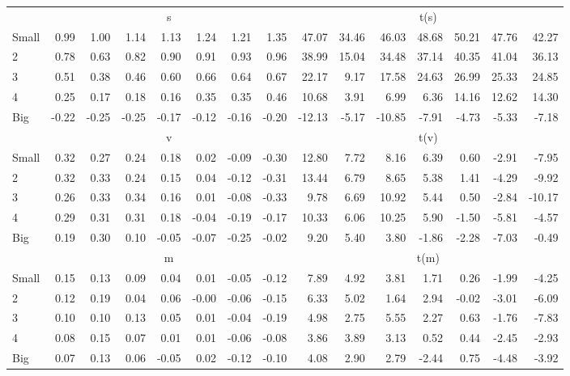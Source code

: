 \begin{table}[!ht]
\begin{tabular}{lrrrrrrrrrrrrrr}
  
     & \multicolumn{7}{c}{s} & \multicolumn{7}{c}{t(s)}   \\
     \cmidrule(r){2-8} \cmidrule(r){9-15} 
    Small  & 0.99  & 1.00  & 1.14  & 1.13  & 1.24  & 1.21  & 1.35  & 47.07  & 34.46  & 46.03  & 48.68  & 50.21  & 47.76  & 42.27   \\
    2  & 0.78  & 0.63  & 0.82  & 0.90  & 0.91  & 0.93  & 0.96  & 38.99  & 15.04  & 34.48  & 37.14  & 40.35  & 41.04  & 36.13   \\
    3  & 0.51  & 0.38  & 0.46  & 0.60  & 0.66  & 0.64  & 0.67  & 22.17  & 9.17  & 17.58  & 24.63  & 26.99  & 25.33  & 24.85   \\
    4  & 0.25  & 0.17  & 0.18  & 0.16  & 0.35  & 0.35  & 0.46  & 10.68  & 3.91  & 6.99  & 6.36  & 14.16  & 12.62  & 14.30   \\
    Big  & -0.22  & -0.25  & -0.25  & -0.17  & -0.12  & -0.16  & -0.20  & -12.13  & -5.17  & -10.85  & -7.91  & -4.73  & -5.33  & -7.18   \\
    
  
     & \multicolumn{7}{c}{v} & \multicolumn{7}{c}{t(v)}   \\
     \cmidrule(r){2-8} \cmidrule(r){9-15} 
    Small  & 0.32  & 0.27  & 0.24  & 0.18  & 0.02  & -0.09  & -0.30  & 12.80  & 7.72  & 8.16  & 6.39  & 0.60  & -2.91  & -7.95   \\
    2  & 0.32  & 0.33  & 0.24  & 0.15  & 0.04  & -0.12  & -0.31  & 13.44  & 6.79  & 8.65  & 5.38  & 1.41  & -4.29  & -9.92   \\
    3  & 0.26  & 0.33  & 0.34  & 0.16  & 0.01  & -0.08  & -0.33  & 9.78  & 6.69  & 10.92  & 5.44  & 0.50  & -2.84  & -10.17   \\
    4  & 0.29  & 0.31  & 0.31  & 0.18  & -0.04  & -0.19  & -0.17  & 10.33  & 6.06  & 10.25  & 5.90  & -1.50  & -5.81  & -4.57   \\
    Big  & 0.19  & 0.30  & 0.10  & -0.05  & -0.07  & -0.25  & -0.02  & 9.20  & 5.40  & 3.80  & -1.86  & -2.28  & -7.03  & -0.49   \\
    
  
     & \multicolumn{7}{c}{m} & \multicolumn{7}{c}{t(m)}   \\
     \cmidrule(r){2-8} \cmidrule(r){9-15} 
    Small  & 0.15  & 0.13  & 0.09  & 0.04  & 0.01  & -0.05  & -0.12  & 7.89  & 4.92  & 3.81  & 1.71  & 0.26  & -1.99  & -4.25   \\
    2  & 0.12  & 0.19  & 0.04  & 0.06  & -0.00  & -0.06  & -0.15  & 6.33  & 5.02  & 1.64  & 2.94  & -0.02  & -3.01  & -6.09   \\
    3  & 0.10  & 0.10  & 0.13  & 0.05  & 0.01  & -0.04  & -0.19  & 4.98  & 2.75  & 5.55  & 2.27  & 0.63  & -1.76  & -7.83   \\
    4  & 0.08  & 0.15  & 0.07  & 0.01  & 0.01  & -0.06  & -0.08  & 3.86  & 3.89  & 3.13  & 0.52  & 0.44  & -2.45  & -2.93   \\
    Big  & 0.07  & 0.13  & 0.06  & -0.05  & 0.02  & -0.12  & -0.10  & 4.08  & 2.90  & 2.79  & -2.44  & 0.75  & -4.48  & -3.92   \\
    

\end{tabular}
\end{table}
